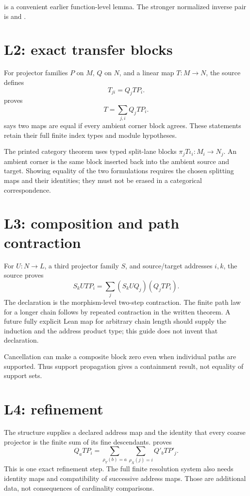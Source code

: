 \documentclass[11pt]{article}
\begin{document}
\texttt{} is a convenient earlier function-level lemma.
The stronger normalized inverse pair is
\texttt{} and
\texttt{}.

\section{L2: exact transfer blocks}
For projector families \(P\) on \(M\), \(Q\) on \(N\), and a linear map
\(T:M\to N\), the source defines
\[
 T_{ji}=Q_jTP_i.
\]
\texttt{} proves
\[
 T=\sum_{j,i}Q_jTP_i.
\]
\texttt{} says two maps are equal if every ambient corner
block agrees. These statements retain their full finite index types and
module hypotheses.

The printed category theorem uses typed split-lane blocks
\(\pi_jT\iota_i:M_i\to N_j\). An ambient corner is the same block inserted
back into the ambient source and target. Showing equality of the two
formulations requires the chosen splitting maps and their identities;
they must not be erased in a categorical correspondence.

\section{L3: composition and path contraction}
For \(U:N\to L\), a third projector family \(S\), and source/target
addresses \(i,k\), the source proves
\[
 S_kUTP_i=\sum_j(S_kUQ_j)(Q_jTP_i).
\]
The declaration \texttt{} is the morphism-level
two-step contraction. The finite path law for a longer chain follows by
repeated contraction in the written theorem. A future fully explicit Lean
map for arbitrary chain length should supply the induction and the address
product type; this guide does not invent that declaration.

Cancellation can make a composite block zero even when individual paths
are supported. Thus support propagation gives a containment result,
not equality of support sets.

\section{L4: refinement}
The structure \texttt{} supplies a declared address map and the
identity that every coarse projector is the finite sum of its fine
descendants. \texttt{} proves
\[
 Q_aTP_i
 =\sum_{\rho_Y(b)=a}\sum_{\rho_X(j)=i}Q'_bTP'_j.
\]
This is one exact refinement step. The full finite resolution system also
needs identity maps and compatibility of successive address maps. Those
are additional data, not consequences of cardinality comparisons.
\end{document}
